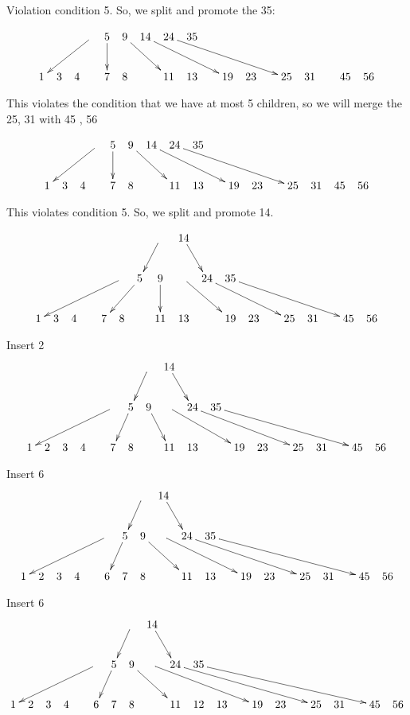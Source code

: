 \documentclass[a4paper]{article}
\begin{document}
Violation condition 5.  So, we split and promote the 35:

$$\xymatrix @C=5pt {
  &  &  &  \ar[dlll] &  5 \ar[d] & 9 \ar[drr] & 14 \ar[drrrr] &  24 \ar[drrrrrr] & 35 \\
1 & 3 & 4 &    & 7 & 8 &   & 11 & 13 &  & 19 & 23 &  & 25 & 31 &  & 45 & 56 \\
}$$

This violates the condition that we have at most 5 children, so we will merge the 25, 31 with 45 , 56

$$\xymatrix @C=5pt {
  &  &  &  \ar[dlll] &  5 \ar[d] & 9 \ar[drr] & 14 \ar[drrrr] &  24 \ar[drrrrrr] & 35 \\
1 & 3 & 4 &    & 7 & 8 &   & 11 & 13 &  & 19 & 23 &  & 25 & 31 & 45 & 56 \\
}$$

This violates condition 5.  So, we split and promote 14.

$$\xymatrix @C=5pt {
  &  & & & & &            &     \ar[dl]      &  14   \ar[dr]       &               &     & \\
  &  & & & &  \ar[dlllll] &  5 \ar[dll] & 9 \ar[d] &  \ar[drr] &  24 \ar[drrrr] & 35 \ar[drrrrrr] \\
1 & 3 & 4 &    & 7 & 8 &   & 11 & 13 & & 19 & 23 &  & 25 & 31 &  & 45 & 56 \\
}$$

Insert 2
$$\xymatrix @C=5pt {
  &  & & & & &            &     \ar[dl]      &  14   \ar[dr]       &               &     & \\
  &  & & & &  \ar[dlllll] &  5 \ar[dl] & 9 \ar[dr] &  \ar[drrr] &  24 \ar[drrrrr] & 35 \ar[drrrrrrr] \\
1 & 2 & 3 & 4 &    & 7 & 8 &   & 11 & 13 & & 19 & 23 &  & 25 & 31 &  & 45 & 56 \\
}$$

Insert 6
$$\xymatrix @C=5pt {
  &  & & & & &            &     \ar[dl]      &  14   \ar[dr]       &               &     & \\
  &  & & & &  \ar[dlllll] &  5 \ar[dl] & 9 \ar[drr] &  \ar[drrrr] &  24 \ar[drrrrrr] & 35 \ar[drrrrrrrr] \\
1 & 2 & 3 & 4 &    & 6 & 7 & 8 &   & 11 & 13 & & 19 & 23 &  & 25 & 31 &  & 45 & 56 \\
}$$

Insert 6
$$\xymatrix @C=5pt {
  &  & & & & &            &     \ar[dl]      &  14   \ar[dr]       &               &     & \\
  &  & & & &  \ar[dlllll] &  5 \ar[dl] & 9 \ar[drr] &  \ar[drrrrr] &  24 \ar[drrrrrrr] & 35 \ar[drrrrrrrrr] \\
1 & 2 & 3 & 4 &    & 6 & 7 & 8 &   & 11 & 12 & 13 & & 19 & 23 &  & 25 & 31 &  & 45 & 56 \\
}$$
\end{document}
